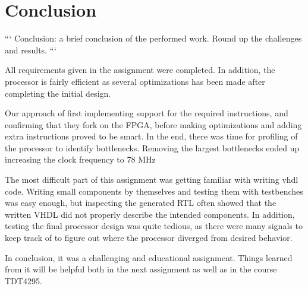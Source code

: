 \section{Conclusion}

```
Conclusion: a brief conclusion of the performed work.
Round up the challenges and results.
```

All requirements given in the assignment were completed.
In addition, the processor is fairly efficient as several optimizations has been made after completing the initial design.

Our approach of first implementing support for the required instructions, and confirming that they fork on the FPGA, before making optimizations and adding extra instructions proved to be smart.
In the end, there was time for profiling of the processor to identify bottlenecks.
Removing the largest bottlenecks ended up increasing the clock frequency to 78 MHz %

The most difficult part of this assignment was getting familiar with writing vhdl code.
Writing small components by themselves and testing them with testbenches was easy enough,
but inspecting the generated RTL often showed that the written VHDL did not properly describe the intended components.
In addition, testing the final processor design was quite tedious, as there were many signals to keep track of to figure out where the processor diverged from desired behavior.

In conclusion, it was a challenging and educational assignment.
Things learned from it will be helpful both in the next assignment as well as in the course TDT4295.

